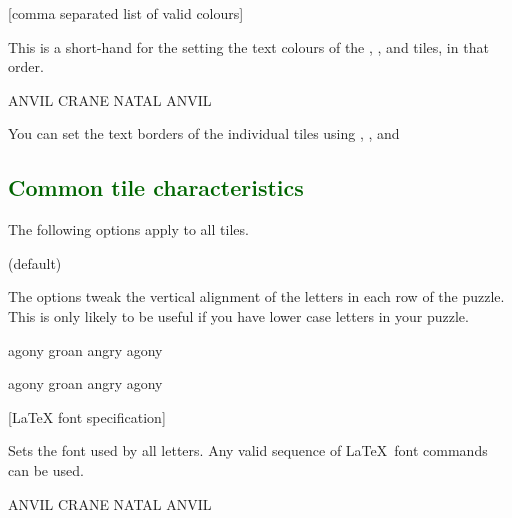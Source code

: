 \documentclass[svgnames]{report}
\newcommand\Section[1]{\subsection{\textcolor{DarkGreen}{#1}}}
\begin{document}
  [comma separated list of valid colours]

  This is a short-hand for the setting the text colours of the
  , ,  and 
  tiles, in that order.

  \begin{example}
    \begin{wordle}[text={red, orange,blue}]{ANVIL}
      CRANE
      NATAL
      ANVIL
    \end{wordle}
  \end{example}

  You can set the text borders of the individual tiles using
  , ,  and 


  \Section{Common tile characteristics}

  The following options apply to all tiles.

   (default) \qquad

  The options tweak the vertical alignment of the letters in each row of
  the puzzle. This is only likely to be useful if you have lower case
  letters in your puzzle.

  \begin{example}
    \begin{wordle}[align]{agony}
       groan
       angry
       agony
    \end{wordle}
  \end{example}

  \begin{example}
    \begin{wordle}[noalign]{agony} %
      groan
      angry
      agony
    \end{wordle}
  \end{example}

       [LaTeX font specification]

  Sets the font used by all  letters. Any valid sequence
  of \LaTeX\ font commands can be used.

  \begin{example}
    \begin{wordle}[font=\large\sffamily]{ANVIL}
      CRANE
      NATAL
      ANVIL
    \end{wordle}
  \end{example}
\end{document}
